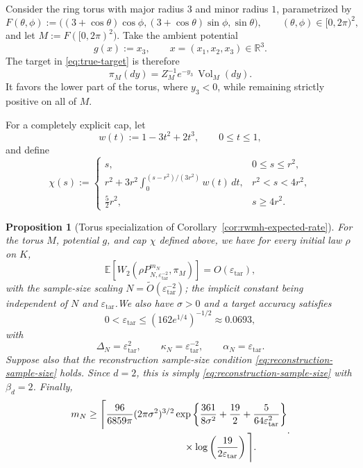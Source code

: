 \documentclass{article}
\newtheorem{proposition}{Proposition}
\newcommand{\R}{\mathbb R}
\newcommand{\E}{\mathbb E}
\newcommand{\Vol}{\operatorname{Vol}}
\numberwithin{equation}{section}
\newcommand{\eps}{\varepsilon}
\renewcommand{\epsilon}{\eps}
\begin{document}
Consider the ring torus with major radius $3$ and minor radius $1$,
parametrized by
\begin{equation}
 F(\theta,\phi)
 :=\bigl((3+\cos\theta)\cos\phi,
         (3+\cos\theta)\sin\phi,
         \sin\theta\bigr),
 \qquad (\theta,\phi)\in[0,2\pi)^2,
\label{eq:torus-parametrization}
\end{equation}
and let $M:=F([0,2\pi)^2)$. Take the ambient potential
\begin{equation}
 g(x):=x_3,
 \qquad x=(x_1,x_2,x_3)\in\R^3.
\label{eq:torus-potential}
\end{equation}
The target in \eqref{eq:true-target} is therefore
\[
 \pi_M(dy)=Z_M^{-1}e^{-y_3}\,\Vol_M(dy).
\]
It favors the lower part of the torus, where $y_3<0$, while remaining
strictly positive on all of $M$.

For a completely explicit cap, let
\[
 w(t):=1-3t^2+2t^3,
 \qquad 0\le t\le1,
\]
and define
\[
 \chi(s):=
 \begin{cases}
  s, &0\le s\le r^2,\\[1mm]
  \displaystyle
  r^2+3r^2\int_0^{(s-r^2)/(3r^2)}w(t)\,dt,
       &r^2<s<4r^2,\\[3mm]
  \displaystyle\frac52r^2, &s\ge4r^2.
 \end{cases}
\]


\begin{proposition}[Torus specialization of Corollary~\ref{cor:rwmh-expected-rate}]
\label{prop:torus-corollary}
For the torus $M$, potential $g$, and cap $\chi$ defined above, we have 
for every initial law $\rho$ on $K$,
\[
 \E\left[W_2\left(
 \rho P_{N,\epsilon_{\mathrm{tar}}^{-2}}^{m_N},\pi_M
 \right)\right]
 =O(\epsilon_{\mathrm{tar}}),
\]
with the sample-size scaling
$N=\widetilde O(\epsilon_{\mathrm{tar}}^{-2})$;
the implicit constant being independent of $N$ and
$\epsilon_{\mathrm{tar}}$.We also have $\sigma>0$ and a target accuracy satisfies
\begin{equation}
 0<\epsilon_{\mathrm{tar}}
 \le(162e^{1/4})^{-1/2}\approx0.0693,
\label{eq:torus-target-range}
\end{equation}
with
\[
 \Delta_N=\epsilon_{\mathrm{tar}}^2,
 \qquad
 \kappa_N=\epsilon_{\mathrm{tar}}^{-2},
 \qquad
 \alpha_N=\epsilon_{\mathrm{tar}}.
\]
Suppose also that the reconstruction sample-size condition
\eqref{eq:reconstruction-sample-size} holds. Since $d=2$, this is simply
\eqref{eq:reconstruction-sample-size} with $\beta_d=2$.
Finally,
\begin{equation}
 \begin{aligned}
 m_N\ge\Bigg\lceil
 &\frac{96}{6859\pi}(2\pi\sigma^2)^{3/2}
 \exp\left\{
  \frac{361}{8\sigma^2}+\frac{19}{2}
  +\frac{5}{64\epsilon_{\mathrm{tar}}^2}
 \right\}\\
 &\hspace{28mm}\times
 \log\left(\frac{19}{2\epsilon_{\mathrm{tar}}}\right)
 \Bigg\rceil.
 \end{aligned}
\label{eq:torus-iteration-count}.
\end{equation}

\end{proposition}
\end{document}
